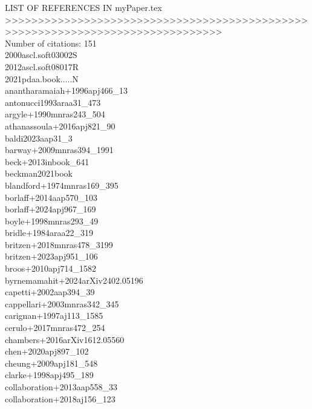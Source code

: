 \documentclass{article}
\begin{document}
\noindent               LIST OF REFERENCES IN myPaper.tex \\
\noindent >>>>>>>>>>>>>>>>>>>>>>>>>>>>>>>>>>>>>>>>>>>>>>>>>>>>>>>>>>>>>>>>>>>>>>>>>>>>>>> \\
\noindent Number of citations: 151 \\
\noindent 2000ascl.soft03002S \\
\noindent 2012ascl.soft08017R \\
\noindent 2021pdaa.book.....N \\
\noindent anantharamaiah+1996apj466_13 \\
\noindent antonucci1993araa31_473 \\
\noindent argyle+1990mnras243_504 \\
\noindent athanassoula+2016apj821_90 \\
\noindent baldi2023aap31_3 \\
\noindent barway+2009mnras394_1991 \\
\noindent beck+2013inbook_641 \\
\noindent beckman2021book \\
\noindent blandford+1974mnras169_395 \\
\noindent borlaff+2014aap570_103 \\
\noindent borlaff+2024apj967_169 \\
\noindent boyle+1998mnras293_49 \\
\noindent bridle+1984araa22_319 \\
\noindent britzen+2018mnras478_3199 \\
\noindent britzen+2023apj951_106 \\
\noindent broos+2010apj714_1582 \\
\noindent byrnemamahit+2024arXiv2402.05196 \\
\noindent capetti+2002aap394_39 \\
\noindent cappellari+2003mnras342_345 \\
\noindent carignan+1997aj113_1585 \\
\noindent cerulo+2017mnras472_254 \\
\noindent chambers+2016arXiv1612.05560 \\
\noindent chen+2020apj897_102 \\
\noindent cheung+2009apj181_548 \\
\noindent clarke+1998apj495_189 \\
\noindent collaboration+2013aap558_33 \\
\noindent collaboration+2018aj156_123 \\
\end{document}

